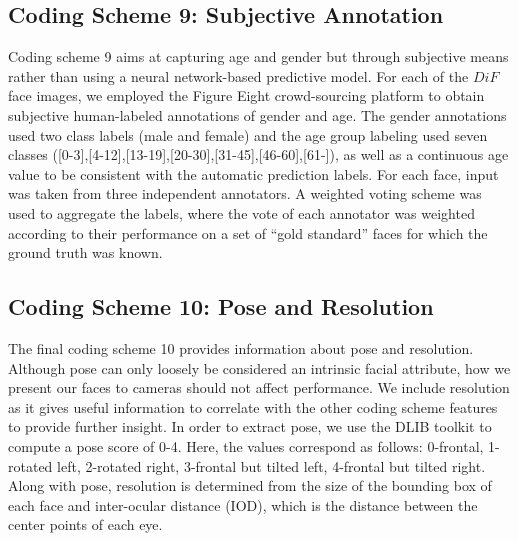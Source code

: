 \documentclass[letterpaper,11pt]{article}
\begin{document}
\subsection{Coding Scheme 9: Subjective Annotation}

Coding scheme 9 aims at capturing age and gender but through subjective means rather than using a neural network-based predictive model.  For each of the $DiF$ face images, we employed the Figure Eight crowd-sourcing platform \cite{f8} to obtain subjective human-labeled annotations of gender and age.
The gender annotations used two class labels (male and female) and the age group labeling used seven classes ([0-3],[4-12],[13-19],[20-30],[31-45],[46-60],[61-]), as well as a continuous age value to be consistent with the automatic prediction labels.  
For each face, input was taken from three independent annotators.  A weighted voting scheme was used to aggregate the labels, where the vote of each annotator was weighted according to their performance on a set of ``gold standard'' faces for which the ground truth was known.

\subsection{Coding Scheme 10: Pose and Resolution}

The final coding scheme 10 provides information about pose and resolution.  Although pose can only loosely be considered an intrinsic facial attribute, how we present our faces to cameras should not affect performance.  We include resolution as it gives useful information to correlate with the other coding scheme features to provide further insight.  In order to extract pose, we use the DLIB toolkit to compute a pose score of 0-4.  Here, the values correspond as follows: 0-frontal, 1-rotated left, 2-rotated right, 3-frontal but tilted left, 4-frontal but tilted right. Along with pose, resolution is determined from the size of the bounding box of each face and inter-ocular distance (IOD), which is the distance between the center points of each eye.
 
\end{document}
